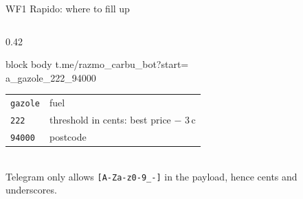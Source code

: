 \documentclass[aspectratio=169,11pt]{beamer}
\begin{document}
\begin{frame}{WF1 \textperiodcentered{} Rapido: where to fill up}
\begin{columns}[T]
\begin{column}{0.42\textwidth}
\begin{beamercolorbox}[rounded=true,sep=7pt]{block body}
        {\ttfamily\scriptsize t.me/razmo\_carbu\_bot?start=\\\hspace*{1em}\colorbox{ratzyellow!40}{a\_gazole\_222\_94000}}\\[5pt]
        \begin{tabular}{@{}ll@{}}
          \texttt{gazole} & fuel\\
          \texttt{222} & threshold in cents: best price $-$ 3\,c\\
          \texttt{94000} & postcode
        \end{tabular}\\[4pt]
        {\color{soft} Telegram only allows \texttt{[A-Za-z0-9\_-]} in the payload, hence cents and underscores.}
      \end{beamercolorbox}
    \end{column}
  \end{columns}
\end{frame}
\end{document}
